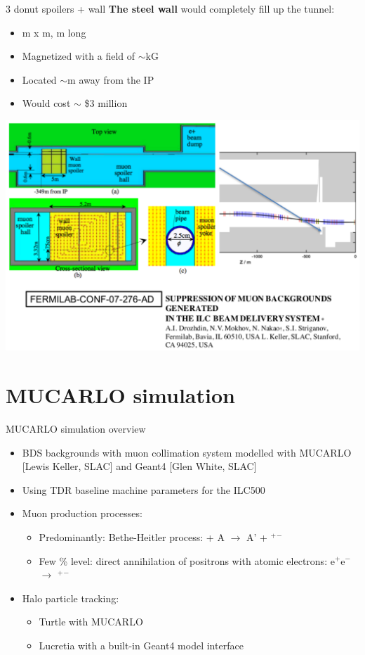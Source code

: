 \documentclass[xcolor={dvipsnames}]{beamer}
\begin{document}
\begin{frame}{3 donut spoilers + wall}
\textbf{The steel wall} would completely fill up the tunnel:
\begin{itemize}
 \item \unit[5]{m} x \unit[3]{m}, \unit[5]{m} long
 \item Magnetized with a field of $\sim$\unit[16]{kG}
 \item Located $\sim$\unit[400]{m} away from the IP
 \item Would cost $\sim$ \$3 million
\end{itemize}
\begin{center}
\includegraphics[height=0.7\textheight]{Muon_wall.pdf}
\end{center}
\end{frame}

\section{MUCARLO simulation}
\begin{frame}{MUCARLO simulation overview}
\begin{itemize}
\item BDS backgrounds with muon collimation system modelled with MUCARLO [Lewis Keller, SLAC] and Geant4 [Glen White, SLAC]
\item Using TDR baseline machine parameters for the ILC500
\item Muon production processes:
\begin{itemize}
\item Predominantly: Bethe-Heitler process: \textgamma + A $\rightarrow$ A' + \textmu$^+$\textmu$^-$
\item Few \% level: direct annihilation of positrons with atomic electrons: e$^+$e$^-$ $\rightarrow$ \textmu$^+$\textmu$^-$
\end{itemize}
\item Halo particle tracking:
\begin{itemize}
\item Turtle with MUCARLO
\item Lucretia with a built-in Geant4 model interface
\end{itemize}
\end{itemize}

\end{frame}
\end{document}
